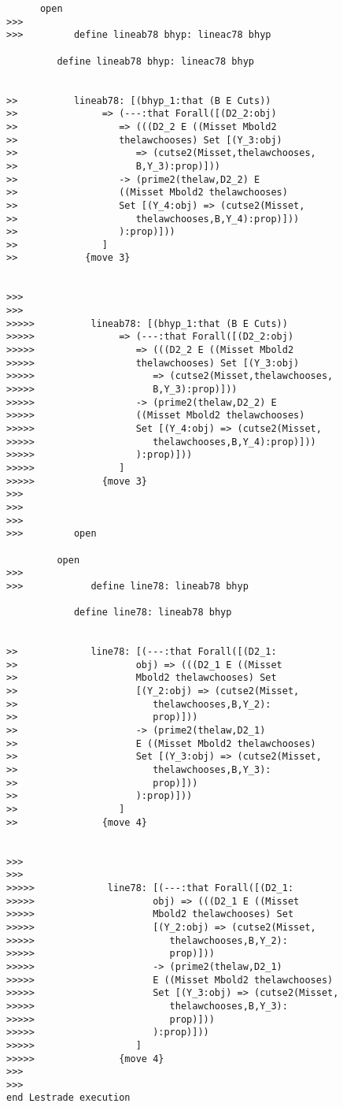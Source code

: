 \documentclass[12pt]{article}
\begin{document}
\begin{verbatim}
      open
>>>
>>>         define lineab78 bhyp: lineac78 bhyp

         define lineab78 bhyp: lineac78 bhyp


>>          lineab78: [(bhyp_1:that (B E Cuts))
>>               => (---:that Forall([(D2_2:obj)
>>                  => (((D2_2 E ((Misset Mbold2
>>                  thelawchooses) Set [(Y_3:obj)
>>                     => (cutse2(Misset,thelawchooses,
>>                     B,Y_3):prop)]))
>>                  -> (prime2(thelaw,D2_2) E
>>                  ((Misset Mbold2 thelawchooses)
>>                  Set [(Y_4:obj) => (cutse2(Misset,
>>                     thelawchooses,B,Y_4):prop)]))
>>                  ):prop)]))
>>               ]
>>            {move 3}


>>>
>>>
>>>>>          lineab78: [(bhyp_1:that (B E Cuts))
>>>>>               => (---:that Forall([(D2_2:obj)
>>>>>                  => (((D2_2 E ((Misset Mbold2
>>>>>                  thelawchooses) Set [(Y_3:obj)
>>>>>                     => (cutse2(Misset,thelawchooses,
>>>>>                     B,Y_3):prop)]))
>>>>>                  -> (prime2(thelaw,D2_2) E
>>>>>                  ((Misset Mbold2 thelawchooses)
>>>>>                  Set [(Y_4:obj) => (cutse2(Misset,
>>>>>                     thelawchooses,B,Y_4):prop)]))
>>>>>                  ):prop)]))
>>>>>               ]
>>>>>            {move 3}
>>>
>>>
>>>
>>>         open

         open
>>>
>>>            define line78: lineab78 bhyp

            define line78: lineab78 bhyp


>>             line78: [(---:that Forall([(D2_1:
>>                     obj) => (((D2_1 E ((Misset
>>                     Mbold2 thelawchooses) Set
>>                     [(Y_2:obj) => (cutse2(Misset,
>>                        thelawchooses,B,Y_2):
>>                        prop)]))
>>                     -> (prime2(thelaw,D2_1)
>>                     E ((Misset Mbold2 thelawchooses)
>>                     Set [(Y_3:obj) => (cutse2(Misset,
>>                        thelawchooses,B,Y_3):
>>                        prop)]))
>>                     ):prop)]))
>>                  ]
>>               {move 4}


>>>
>>>
>>>>>             line78: [(---:that Forall([(D2_1:
>>>>>                     obj) => (((D2_1 E ((Misset
>>>>>                     Mbold2 thelawchooses) Set
>>>>>                     [(Y_2:obj) => (cutse2(Misset,
>>>>>                        thelawchooses,B,Y_2):
>>>>>                        prop)]))
>>>>>                     -> (prime2(thelaw,D2_1)
>>>>>                     E ((Misset Mbold2 thelawchooses)
>>>>>                     Set [(Y_3:obj) => (cutse2(Misset,
>>>>>                        thelawchooses,B,Y_3):
>>>>>                        prop)]))
>>>>>                     ):prop)]))
>>>>>                  ]
>>>>>               {move 4}
>>>
>>>
end Lestrade execution
\end{verbatim}
\end{document}
